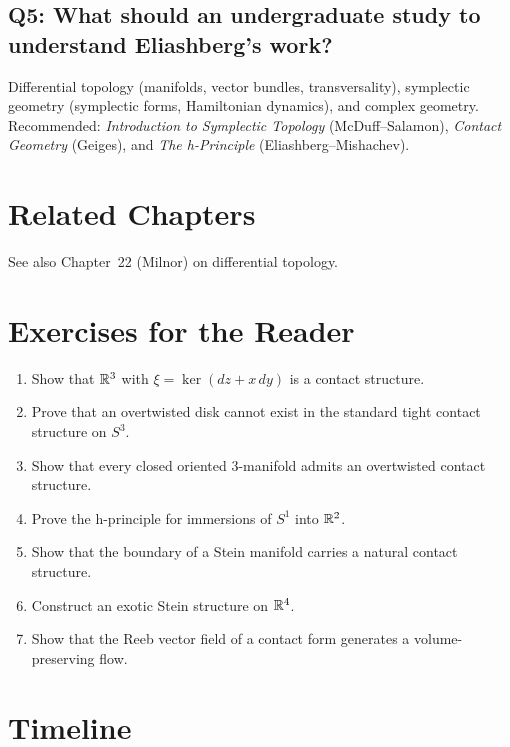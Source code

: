 \subsection*{Q5: What should an undergraduate study to understand Eliashberg's work?}
Differential topology (manifolds, vector bundles, transversality), symplectic geometry (symplectic forms, Hamiltonian dynamics), and complex geometry. Recommended: \textit{Introduction to Symplectic Topology} (McDuff--Salamon), \textit{Contact Geometry} (Geiges), and \textit{The h-Principle} (Eliashberg--Mishachev).

\section{Related Chapters}
See also Chapter~22 (Milnor) on differential topology.

\section*{Exercises for the Reader}

\begin{enumerate}
    \item [B] Show that $\mathbb{R}^3$ with $\xi = \ker(dz + x\,dy)$ is a contact structure.
    \item [I] Prove that an overtwisted disk cannot exist in the standard tight contact structure on $S^3$.
    \item [A] Show that every closed oriented 3-manifold admits an overtwisted contact structure.
    \item [I] Prove the h-principle for immersions of $S^1$ into $\mathbb{R}^2$.
    \item [I] Show that the boundary of a Stein manifold carries a natural contact structure.
    \item [A] Construct an exotic Stein structure on $\mathbb{R}^4$.
    \item [B] Show that the Reeb vector field of a contact form generates a volume-preserving flow.
\end{enumerate}

\section*{Timeline}

